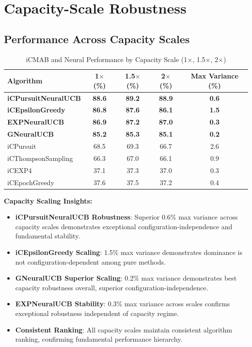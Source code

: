 \documentclass[12pt,a4paper]{article}
\newcommand{\primarytext}[1]{\textcolor{primaryblue}{\textbf{#1}}}
\newcommand{\secondarytext}[1]{\textcolor{secondaryblue}{\textbf{#1}}}
\newcommand{\legacy}[1]{\textcolor{legacycolor}{\textbf{#1}}}
\newcommand{\neural}[1]{\textcolor{neuralcolor}{\textbf{#1}}}
\begin{document}
\section{Capacity-Scale Robustness}

\subsection{Performance Across Capacity Scales}

\begin{table}[H]
\centering
\caption{iCMAB and Neural Performance by Capacity Scale (1$\times$, 1.5$\times$, 2$\times$)}
\label{tab:capacity-scale}
\begin{tabular}{@{}lcccc@{}}\toprule
\textbf{Algorithm} & \textbf{1$\times$ (\%)} & \textbf{1.5$\times$ (\%)} & \textbf{2$\times$ (\%)} & \textbf{Max Variance (\%)} \\\midrule
\neural{iCPursuitNeuralUCB}   & \neural{88.6} & \neural{89.2} & \neural{88.9} & \neural{0.6} \\
\primarytext{iCEpsilonGreedy}   & \primarytext{86.8} & \primarytext{87.6} & \primarytext{86.1} & \primarytext{1.5} \\
\legacy{EXPNeuralUCB}           & \legacy{86.9} & \legacy{87.2} & \legacy{87.0} & \legacy{0.3} \\
\neural{GNeuralUCB}            & \neural{85.2} & \neural{85.3} & \neural{85.1} & \neural{0.2} \\
iCPursuit                       & 68.5 & 69.3 & 66.7 & 2.6 \\
iCThompsonSampling              & 66.3 & 67.0 & 66.1 & 0.9 \\
iCEXP4                          & 37.1 & 37.3 & 37.0 & 0.3 \\
iCEpochGreedy                   & 37.6 & 37.5 & 37.2 & 0.4 \\\bottomrule
\end{tabular}
\end{table}

\textbf{Capacity Scaling Insights:}
\begin{itemize}
\item \neural{iCPursuitNeuralUCB Robustness}: Superior 0.6\% max variance across capacity scales demonstrates exceptional configuration-independence and fundamental stability.
\item \primarytext{iCEpsilonGreedy Scaling}: 1.5\% max variance demonstrates dominance is not configuration-dependent among pure methods.
\item \neural{GNeuralUCB Superior Scaling}: 0.2\% max variance demonstrates best capacity robustness overall, superior configuration-independence.
\item \legacy{EXPNeuralUCB Stability}: 0.3\% max variance across scales confirms exceptional robustness independent of capacity regime.
\item \secondarytext{Consistent Ranking}: All capacity scales maintain consistent algorithm ranking, confirming fundamental performance hierarchy.
\end{itemize}
\end{document}
